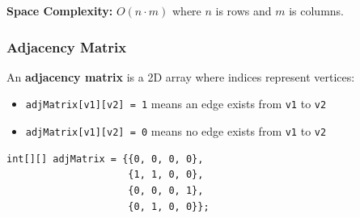 \textbf{Space Complexity:} $O(n \cdot m)$ where $n$ is rows and $m$ is columns.

\subsubsection{Adjacency Matrix}

An \textbf{adjacency matrix} is a 2D array where indices represent vertices:
\begin{itemize}
  \item \texttt{adjMatrix[v1][v2] = 1} means an edge exists from \texttt{v1} to \texttt{v2}
  \item \texttt{adjMatrix[v1][v2] = 0} means no edge exists from \texttt{v1} to \texttt{v2}
\end{itemize}

\begin{verbatim}
int[][] adjMatrix = {{0, 0, 0, 0},
                     {1, 1, 0, 0},
                     {0, 0, 0, 1},
                     {0, 1, 0, 0}};
\end{verbatim}


